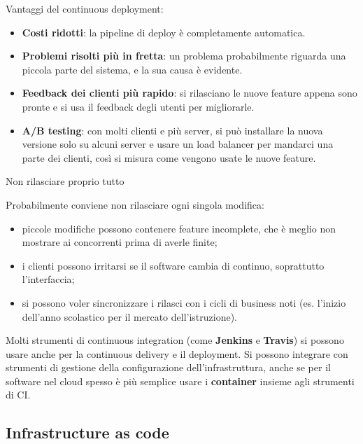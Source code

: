Vantaggi del continuous deployment:

\begin{itemize}
\tightlist
\item
  \textbf{Costi ridotti}: la pipeline di deploy è completamente
  automatica.
\item
  \textbf{Problemi risolti più in fretta}: un problema probabilmente
  riguarda una piccola parte del sistema, e la sua causa è evidente.
\item
  \textbf{Feedback dei clienti più rapido}: si rilasciano le nuove
  feature appena sono pronte e si usa il feedback degli utenti per
  migliorarle.
\item
  \textbf{A/B testing}: con molti clienti e più server, si può
  installare la nuova versione solo su alcuni server e usare un load
  balancer per mandarci una parte dei clienti, così si misura come
  vengono usate le nuove feature.
\end{itemize}

\begin{boxwarning}{Non rilasciare proprio tutto}

Probabilmente conviene non rilasciare ogni singola modifica:

\begin{itemize}
\tightlist
\item
  piccole modifiche possono contenere feature incomplete, che è meglio
  non mostrare ai concorrenti prima di averle finite;
\item
  i clienti possono irritarsi se il software cambia di continuo,
  soprattutto l'interfaccia;
\item
  si possono voler sincronizzare i rilasci con i cicli di business noti
  (es. l'inizio dell'anno scolastico per il mercato dell'istruzione).
\end{itemize}

\end{boxwarning}

Molti strumenti di continuous integration (come \textbf{Jenkins} e
\textbf{Travis}) si possono usare anche per la continuous delivery e il
deployment. Si possono integrare con strumenti di gestione della
configurazione dell'infrastruttura, anche se per il software nel cloud
spesso è più semplice usare i \textbf{container} insieme agli strumenti
di CI.

\subsection{Infrastructure as code}\label{infrastructure-as-code}

